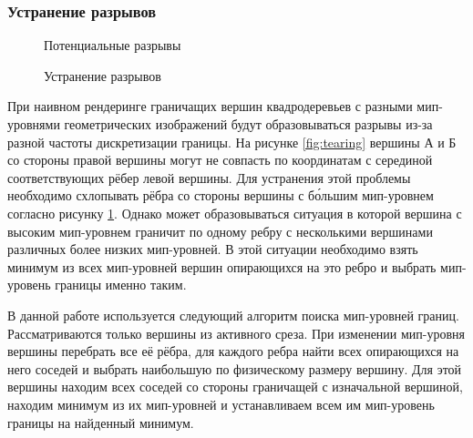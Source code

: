 \subsubsection{Устранение разрывов}
\begin{figure}[ht]
  \centering
  \caption{Потенциальные разрывы}
  \label{fig:tearing}
\endminipage\hfill
%
  \centering
  \caption{Устранение разрывов}
  \label{fig:stitching}
\endminipage
\end{figure}
При наивном рендеринге граничащих вершин квадродеревьев с разными мип-уровнями геометрических изображений будут образовываться разрывы из-за разной частоты дискретизации границы. На рисунке \ref{fig:tearing} вершины А и Б со стороны правой вершины могут не совпасть по координатам с серединой соответствующих рёбер левой вершины. Для устранения этой проблемы необходимо схлопывать рёбра со стороны вершины с б\'ольшим мип-уровнем согласно рисунку \ref{fig:stitching}. Однако может образовываться ситуация в которой вершина с высоким мип-уровнем граничит по одному ребру с несколькими вершинами различных более низких мип-уровней. В этой ситуации необходимо взять минимум из всех мип-уровней вершин опирающихся на это ребро и выбрать мип-уровень границы именно таким.

В данной работе используется следующий алгоритм поиска мип-уровней границ. Рассматриваются только вершины из активного среза. При изменении мип-уровня вершины перебрать все её рёбра, для каждого ребра найти всех опирающихся на него соседей и выбрать наибольшую по физическому размеру вершину. Для этой вершины находим всех соседей со стороны граничащей с изначальной вершиной, находим минимум из их мип-уровней и устанавливаем всем им мип-уровень границы на найденный минимум.

